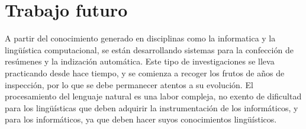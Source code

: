 \section{Trabajo futuro}

A partir del conocimiento generado en disciplinas como la informatica y la lingüística computacional, se están desarrollando sistemas para la confección de resúmenes y la indización automática. Este tipo de investigaciones se lleva practicando desde hace tiempo, y se comienza a recoger los frutos de años de inspección, por lo que se debe permanecer atentos a su evolución. El procesamiento del lenguaje natural es una labor
compleja, no exento de dificultad para los lingüísticas que deben adquirir la instrumentación de los informáticos, y para los informáticos, ya que deben hacer suyos 
conocimientos lingüísticos.
